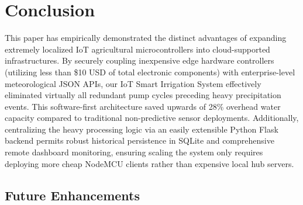 \documentclass[conference]{IEEEtran}
\begin{document}
\section{Conclusion}

This paper has empirically demonstrated the distinct advantages of expanding extremely localized IoT agricultural microcontrollers into cloud-supported infrastructures. By securely coupling inexpensive edge hardware controllers (utilizing less than \$10 USD of total electronic components) with enterprise-level meteorological JSON APIs, our IoT Smart Irrigation System effectively eliminated virtually all redundant pump cycles preceding heavy precipitation events. This software-first architecture saved upwards of 28\% overhead water capacity compared to traditional non-predictive sensor deployments. Additionally, centralizing the heavy processing logic via an easily extensible Python Flask backend permits robust historical persistence in SQLite and comprehensive remote dashboard monitoring, ensuring scaling the system only requires deploying more cheap NodeMCU clients rather than expensive local hub servers.

\subsection{Future Enhancements}
\end{document}
